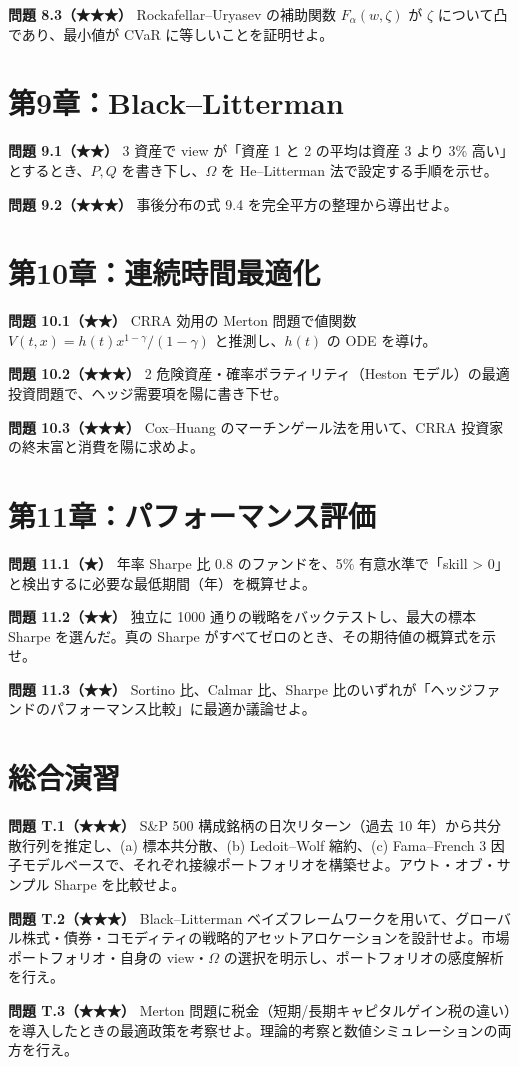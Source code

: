 \documentclass[11pt,a4paper]{report}
\begin{document}
\textbf{問題 8.3（★★★）} Rockafellar–Uryasev の補助関数 $F_\alpha(w, \zeta)$ が $\zeta$ について凸であり、最小値が CVaR に等しいことを証明せよ。

\section{第9章：Black–Litterman}

\textbf{問題 9.1（★★）} 3 資産で view が「資産 1 と 2 の平均は資産 3 より 3\% 高い」とするとき、$P, Q$ を書き下し、$\Omega$ を He–Litterman 法で設定する手順を示せ。

\textbf{問題 9.2（★★★）} 事後分布の式 9.4 を完全平方の整理から導出せよ。

\section{第10章：連続時間最適化}

\textbf{問題 10.1（★★）} CRRA 効用の Merton 問題で値関数 $V(t, x) = h(t) x^{1-\gamma}/(1-\gamma)$ と推測し、$h(t)$ の ODE を導け。

\textbf{問題 10.2（★★★）} 2 危険資産・確率ボラティリティ（Heston モデル）の最適投資問題で、ヘッジ需要項を陽に書き下せ。

\textbf{問題 10.3（★★★）} Cox–Huang のマーチンゲール法を用いて、CRRA 投資家の終末富と消費を陽に求めよ。

\section{第11章：パフォーマンス評価}

\textbf{問題 11.1（★）} 年率 Sharpe 比 0.8 のファンドを、5\% 有意水準で「skill > 0」と検出するに必要な最低期間（年）を概算せよ。

\textbf{問題 11.2（★★）} 独立に 1000 通りの戦略をバックテストし、最大の標本 Sharpe を選んだ。真の Sharpe がすべてゼロのとき、その期待値の概算式を示せ。

\textbf{問題 11.3（★★）} Sortino 比、Calmar 比、Sharpe 比のいずれが「ヘッジファンドのパフォーマンス比較」に最適か議論せよ。

\section{総合演習}

\textbf{問題 T.1（★★★）} S\&P 500 構成銘柄の日次リターン（過去 10 年）から共分散行列を推定し、(a) 標本共分散、(b) Ledoit–Wolf 縮約、(c) Fama–French 3 因子モデルベースで、それぞれ接線ポートフォリオを構築せよ。アウト・オブ・サンプル Sharpe を比較せよ。

\textbf{問題 T.2（★★★）} Black–Litterman ベイズフレームワークを用いて、グローバル株式・債券・コモディティの戦略的アセットアロケーションを設計せよ。市場ポートフォリオ・自身の view・$\Omega$ の選択を明示し、ポートフォリオの感度解析を行え。

\textbf{問題 T.3（★★★）} Merton 問題に税金（短期/長期キャピタルゲイン税の違い）を導入したときの最適政策を考察せよ。理論的考察と数値シミュレーションの両方を行え。

\noindent\hrulefill
\end{document}
